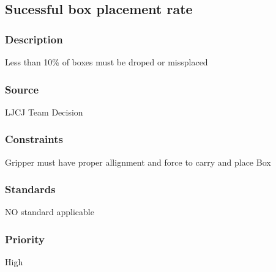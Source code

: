 \subsection{Sucessful box placement rate}
\subsubsection{Description}
 Less than 10\% of boxes must be droped or missplaced
\subsubsection{Source}
LJCJ Team Decision
\subsubsection{Constraints}
Gripper must have proper allignment and force to carry and place Box
\subsubsection{Standards}
NO standard applicable
\subsubsection{Priority}
High

